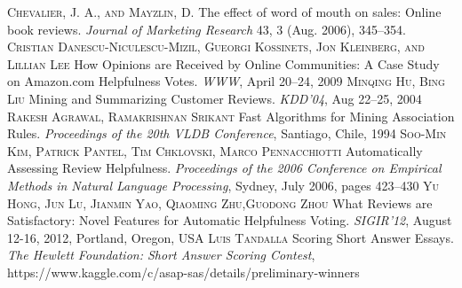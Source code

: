 \documentclass[a4paper,12pt,title]{article}
\begin{document}
\begin{thebibliography}{9}
\textsc{Chevalier, J. A., and Mayzlin, D.} The effect of word of mouth on sales: Online book reviews. \textit{Journal of Marketing Research} 43, 3 (Aug. 2006), 345–354.
\textsc{Cristian Danescu-Niculescu-Mizil, Gueorgi Kossinets, Jon Kleinberg, and Lillian Lee} How Opinions are Received by Online Communities: A Case Study on Amazon.com Helpfulness Votes. \textit{WWW}, April 20–24, 2009
\textsc{Minqing Hu, Bing Liu} Mining and Summarizing Customer Reviews. \textit{KDD'04}, Aug 22–25, 2004
\textsc{Rakesh Agrawal, Ramakrishnan Srikant} Fast Algorithms for Mining Association Rules. \textit{Proceedings of the 20th VLDB Conference}, Santiago, Chile, 1994
\textsc{Soo-Min Kim, Patrick Pantel, Tim Chklovski, Marco Pennacchiotti} Automatically Assessing Review Helpfulness. \textit{Proceedings of the 2006 Conference on Empirical Methods in Natural Language Processing}, Sydney, July 2006, pages 423–430
 \textsc{Yu Hong, Jun Lu, Jianmin Yao, Qiaoming Zhu,Guodong Zhou} What Reviews are Satisfactory: Novel Features for Automatic Helpfulness Voting. \textit{SIGIR’12}, August 12-16, 2012, Portland, Oregon, USA
 \textsc{Luis Tandalla} Scoring Short Answer Essays. \textit{The Hewlett Foundation: Short Answer Scoring Contest}, https://www.kaggle.com/c/asap-sas/details/preliminary-winners
\end{thebibliography}
\end{document}
